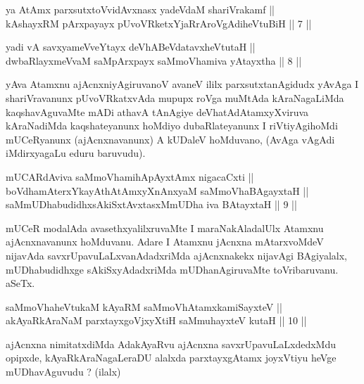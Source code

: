 \begin{shl}
ya AtAmx parxsutxtoV\s vidAvxnasx yadeVdaM shariVrakamf || \\
kAshayxRM pArxpayayx pUvoVRketxYjaRrAroVgAdiheVtuBiH \hfill || 7 ||
  
\end{shl}

\begin{shl}
yadi vA savxyameVveYtayx deVhABeVdatavxheVtutaH || \\
dwbaRlayxmeVvaM saMpArxpayx saMmoVhamiva yAtayxtha \hfill || 8 ||
  
\end{shl}

\begin{artha}
yAva Atamxnu ajAcnxniyAgiruvanoV avaneV ililx parxsutxtanAgidudx yAvAga
I shariVravanunx pUvoVRkatxvAda mupupx roVga muMtAda kAraNagaLiMda
kaqshavAguvaMte mADi athavA tAnAgiye deVhatAdAtamxyXviruva kAraNadiMda
kaqshateyanunx hoMdiyo dubaRlateyanunx I riVtiyAgihoMdi mUCeRyanunx
(ajAcnxnavanunx) A kUDaleV hoMduvano,  (AvAga vAgAdi iMdirxyagaLu eduru
baruvudu).
\end{artha}

\begin{shl}
mUCARdAviva saMmoVhamihApAyxtAmx nigacaCxti || \\
boVdhamAterxYkayAthAtAmxyXnAnxyaM saMmoVhaBAgayxtaH ||  \\
saMmUDhabudidhxsAkiSxtAvxtasxMmUDha iva BAtayxtaH \hfill || 9 ||
  
\end{shl}

\begin{artha}
mUCeR modalAda avasethxyalilxruvaMte I maraNakAladalUlx Atamxnu
ajAcnxnavanunx hoMduvanu. Adare I Atamxnu jAcnxna mAtarxvoMdeV
nijavAda savxrUpavuLaLxvanAdadxriMda ajAcnxnakekx nijavAgi BAgiyalalx,
mUDhabudidhxge sAkiSxyAdadxriMda mUDhanAgiruvaMte toVribaruvanu. aSeTx.
\end{artha}


\begin{shl}
saMmoVhaheVtukaM kAyaRM saMmoVhAtamxkamiSayxteV ||  \\
akAyaRkAraNaM parxtayxgoVjxyXtiH saMmuhayxteV kutaH \hfill || 10 ||
  
\end{shl}

\begin{artha}
ajAcnxna nimitatxdiMda AdakAyaRvu ajAcnxna savxrUpavuLaLxdedxMdu
opipxde, kAyaRkAraNagaLeraDU alalxda parxtayxgAtamx joyxVtiyu heVge
mUDhavAguvudu ? (ilalx)
\end{artha}

